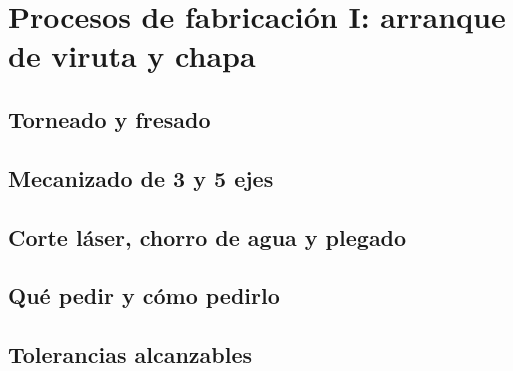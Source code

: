 \chapter{Procesos de fabricación I: arranque de viruta y chapa}
\label{ch:fabricacion_i}

\begin{objetivos}
  \item {}
  \item {}
  \item {}
\end{objetivos}


\section{Torneado y fresado}
\label{sec:fabricacion_i:01}

\section{Mecanizado de 3 y 5 ejes}
\label{sec:fabricacion_i:02}

\section{Corte láser, chorro de agua y plegado}
\label{sec:fabricacion_i:03}

\section{Qué pedir y cómo pedirlo}
\label{sec:fabricacion_i:04}

\section{Tolerancias alcanzables}
\label{sec:fabricacion_i:05}


